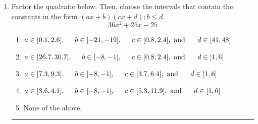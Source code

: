 \documentclass[14pt]{extbook}
\newcommand{\litem}[1]{\item#1\hspace*{-1cm}\rule{\textwidth}{0.4pt}}
\begin{document}
\begin{enumerate}
{\begin{enumerate}[label=\Alph*.]
\end{enumerate} }
\litem{
Factor the quadratic below. Then, choose the intervals that contain the constants in the form $(ax+b)(cx+d); b \leq d.$\[ 36x^{2} +25 x -25 \]\begin{enumerate}[label=\Alph*.]
\item \( a \in [0.1, 2.6], \hspace*{5mm} b \in [-21, -19], \hspace*{5mm} c \in [0.8, 2.4], \text{ and } \hspace*{5mm} d \in [41, 48] \)
\item \( a \in [26.7, 30.7], \hspace*{5mm} b \in [-8, -1], \hspace*{5mm} c \in [0.8, 2.4], \text{ and } \hspace*{5mm} d \in [1, 6] \)
\item \( a \in [7.3, 9.3], \hspace*{5mm} b \in [-8, -1], \hspace*{5mm} c \in [3.7, 6.4], \text{ and } \hspace*{5mm} d \in [1, 6] \)
\item \( a \in [3.6, 4.1], \hspace*{5mm} b \in [-8, -1], \hspace*{5mm} c \in [5.3, 11.9], \text{ and } \hspace*{5mm} d \in [1, 6] \)
\item \( \text{None of the above.} \)


\end{enumerate}}
\end{enumerate}
\end{document}
